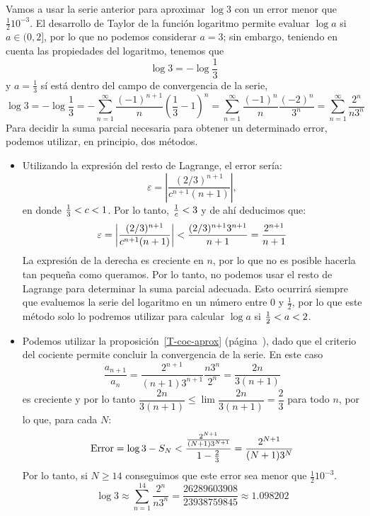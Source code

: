 \begin{ejemplo}
Vamos a usar la serie anterior para aproximar $\log 3$ con un error menor que $\frac1210^{-3}$.
El desarrollo de Taylor de la función logaritmo permite evaluar $\log a$ si $a\in (0,2]$,
por lo que no podemos considerar $a=3$;
sin embargo, teniendo en cuenta las propiedades del logaritmo, tenemos que
\[
\log 3 =-\log \dfrac{1}{3}
\]
y $a=\frac13$ sí está dentro del campo de convergencia de la serie,
\[
\log 3 =-\log\frac13 = -\displaystyle\sum_{n=1}^\infty   \frac{(-1)^{n+1}}{n}(\frac13-1)^n =
\displaystyle\sum_{n=1}^\infty   \frac{(-1)^{n}}{n}\frac{(-2)^n}{3^n}
=\displaystyle\sum_{n=1}^\infty   \frac{2^n}{n3^n}
\]
Para decidir la suma parcial necesaria para obtener un determinado error, podemos utilizar, en principio, dos métodos.
\begin{itemize}
\item
Utilizando la expresión del resto de Lagrange, el error sería:
\[
\varepsilon = \left|\frac{(2/3)^{n+1}}{c^{n+1}(n+1)}\right|,
\]
en donde $\frac13< c< 1$. Por lo tanto, $\frac1c< 3$ y de ahí deducimos que:
\[
\varepsilon = \left|\frac{(2/3)^{n+1}}{c^{n+1}(n+1)}\right|
<  \frac{(2/3)^{n+1} 3^{n+1}}{n+1} = \frac{2^{n+1}}{n+1}
\]
La expresión de la derecha es creciente en $n$, por lo que no es posible hacerla tan pequeña como queramos.
Por lo tanto, no podemos usar el resto de Lagrange para determinar la suma parcial adecuada.
Esto ocurrirá siempre que evaluemos la serie del logaritmo en un número entre 0 y $\frac12$, por lo que este método solo lo podremos utilizar para calcular $\log a$ si $\frac12< a< 2$.

\item
Podemos utilizar la proposición~\ref{T-coc-aprox} (página~\pageref{T-coc-aprox}), dado que el criterio del cociente permite concluir la convergencia de la serie.
En este caso
\[
\frac{a_{n+1}}{a_n} = \frac{2^{n+1}}{(n+1)3^{n+1}}\frac{n3^n}{2^n} = \frac{2n}{3(n+1)}
\]
es creciente y por lo tanto $\dfrac{2n}{3(n+1)}\le \lim\dfrac{2n}{3(n+1)}=\dfrac23$ para todo $n$, por lo que, para cada $N$:
\[
\mathrm{Error}=\log 3-S_N <  \frac{\frac{2^{N+1}}{(N+1)3^{N+1}}}{1-\frac23}
=\frac{2^{N+1}}{(N+1)3^N}
\]
Por lo tanto, si $N\ge 14$ conseguimos que este error sea menor que $\frac1210^{-3}$.
\[
\log 3 \approx\sum_{n=1}^{14} \frac{2^n}{n3^n} = \frac{26289603908}{23938759845}\approx 1.098202
\tag*{\fej}
\]
\end{itemize}
\end{ejemplo}

